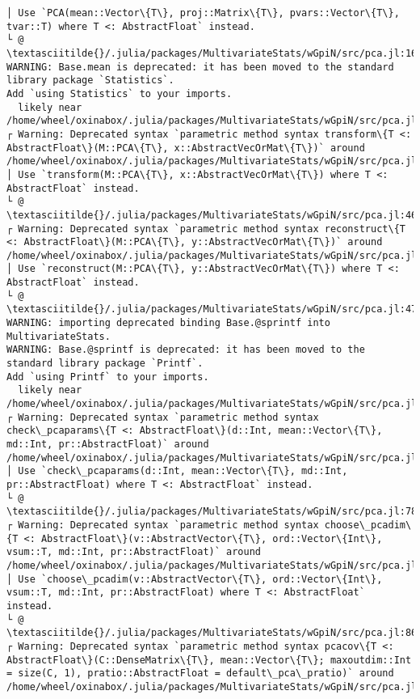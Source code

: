 \documentclass[11pt]{article}
\begin{document}
\begin{Verbatim}[commandchars=\\\{\}]
│ Use `PCA(mean::Vector\{T\}, proj::Matrix\{T\}, pvars::Vector\{T\}, tvar::T) where T <: AbstractFloat` instead.
└ @ \textasciitilde{}/.julia/packages/MultivariateStats/wGpiN/src/pca.jl:16
WARNING: Base.mean is deprecated: it has been moved to the standard library package `Statistics`.
Add `using Statistics` to your imports.
  likely near /home/wheel/oxinabox/.julia/packages/MultivariateStats/wGpiN/src/pca.jl:31
┌ Warning: Deprecated syntax `parametric method syntax transform\{T <: AbstractFloat\}(M::PCA\{T\}, x::AbstractVecOrMat\{T\})` around /home/wheel/oxinabox/.julia/packages/MultivariateStats/wGpiN/src/pca.jl:46.
│ Use `transform(M::PCA\{T\}, x::AbstractVecOrMat\{T\}) where T <: AbstractFloat` instead.
└ @ \textasciitilde{}/.julia/packages/MultivariateStats/wGpiN/src/pca.jl:46
┌ Warning: Deprecated syntax `parametric method syntax reconstruct\{T <: AbstractFloat\}(M::PCA\{T\}, y::AbstractVecOrMat\{T\})` around /home/wheel/oxinabox/.julia/packages/MultivariateStats/wGpiN/src/pca.jl:47.
│ Use `reconstruct(M::PCA\{T\}, y::AbstractVecOrMat\{T\}) where T <: AbstractFloat` instead.
└ @ \textasciitilde{}/.julia/packages/MultivariateStats/wGpiN/src/pca.jl:47
WARNING: importing deprecated binding Base.@sprintf into MultivariateStats.
WARNING: Base.@sprintf is deprecated: it has been moved to the standard library package `Printf`.
Add `using Printf` to your imports.
  likely near /home/wheel/oxinabox/.julia/packages/MultivariateStats/wGpiN/src/pca.jl:51
┌ Warning: Deprecated syntax `parametric method syntax check\_pcaparams\{T <: AbstractFloat\}(d::Int, mean::Vector\{T\}, md::Int, pr::AbstractFloat)` around /home/wheel/oxinabox/.julia/packages/MultivariateStats/wGpiN/src/pca.jl:78.
│ Use `check\_pcaparams(d::Int, mean::Vector\{T\}, md::Int, pr::AbstractFloat) where T <: AbstractFloat` instead.
└ @ \textasciitilde{}/.julia/packages/MultivariateStats/wGpiN/src/pca.jl:78
┌ Warning: Deprecated syntax `parametric method syntax choose\_pcadim\{T <: AbstractFloat\}(v::AbstractVector\{T\}, ord::Vector\{Int\}, vsum::T, md::Int, pr::AbstractFloat)` around /home/wheel/oxinabox/.julia/packages/MultivariateStats/wGpiN/src/pca.jl:86.
│ Use `choose\_pcadim(v::AbstractVector\{T\}, ord::Vector\{Int\}, vsum::T, md::Int, pr::AbstractFloat) where T <: AbstractFloat` instead.
└ @ \textasciitilde{}/.julia/packages/MultivariateStats/wGpiN/src/pca.jl:86
┌ Warning: Deprecated syntax `parametric method syntax pcacov\{T <: AbstractFloat\}(C::DenseMatrix\{T\}, mean::Vector\{T\}; maxoutdim::Int = size(C, 1), pratio::AbstractFloat = default\_pca\_pratio)` around /home/wheel/oxinabox/.julia/packages/MultivariateStats/wGpiN/src/pca.jl:103.

\end{Verbatim}
\end{document}
